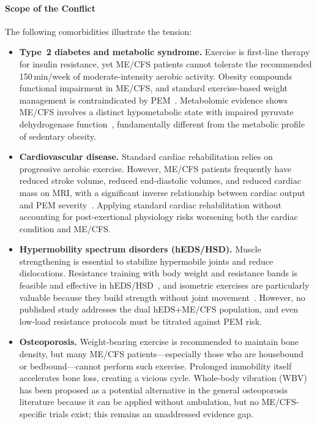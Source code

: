 \paragraph{Scope of the Conflict}

The following comorbidities illustrate the tension:

\begin{itemize}
    \item \textbf{Type~2 diabetes and metabolic syndrome.} Exercise is
      first-line therapy for insulin resistance, yet ME/CFS patients cannot
      tolerate the recommended 150\,min/week of moderate-intensity aerobic
      activity. Obesity compounds functional impairment in ME/CFS, and
      standard exercise-based weight management is contraindicated by
      PEM~\cite{Flores2013obesity}. Metabolomic evidence shows ME/CFS
      involves a distinct hypometabolic state with impaired pyruvate
      dehydrogenase function~\cite{Naviaux2016metabolomics}, fundamentally
      different from the metabolic profile of sedentary obesity.

    \item \textbf{Cardiovascular disease.} Standard cardiac rehabilitation
      relies on progressive aerobic exercise. However, ME/CFS patients
      frequently have reduced stroke volume, reduced end-diastolic volumes,
      and reduced cardiac mass on MRI, with a significant inverse
      relationship between cardiac output and PEM
      severity~\cite{Natelson2021cardiac}. Applying standard cardiac
      rehabilitation without accounting for post-exertional physiology risks
      worsening both the cardiac condition and ME/CFS.

    \item \textbf{Hypermobility spectrum disorders (hEDS/HSD).} Muscle
      strengthening is essential to stabilize hypermobile joints and reduce
      dislocations. Resistance training with body weight and resistance bands
      is feasible and effective in hEDS/HSD~\cite{BurykIggers2022EDS}, and
      isometric exercises are particularly valuable because they build
      strength without joint movement~\cite{Zabriskie2022hEDSresistance}.
      However, no published study addresses the dual hEDS+ME/CFS population,
      and even low-load resistance protocols must be titrated against PEM
      risk.

    \item \textbf{Osteoporosis.} Weight-bearing exercise is recommended to
      maintain bone density, but many ME/CFS patients---especially those who
      are housebound or bedbound---cannot perform such exercise. Prolonged
      immobility itself accelerates bone loss, creating a vicious cycle.
      Whole-body vibration (WBV) has been proposed as a potential alternative
      in the general osteoporosis literature because it can be applied without
      ambulation, but no ME/CFS-specific trials exist; this remains an
      unaddressed evidence gap.


\end{itemize}
